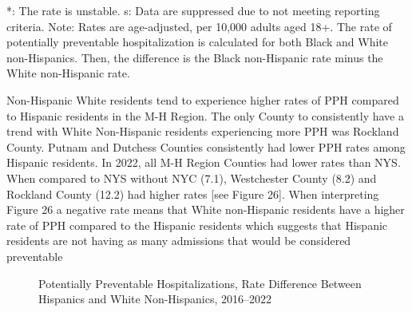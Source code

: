 \documentclass[
  english,
  letterpaper,
]{report}
\begin{document}
\begin{tcolorbox}[enhanced jigsaw, breakable, leftrule=.75mm, title=\textcolor{quarto-callout-note-color}{\faInfo}\hspace{0.5em}{Note}, bottomrule=.15mm, opacityback=0, left=2mm, colback=white, bottomtitle=1mm, coltitle=black, colbacktitle=quarto-callout-note-color!10!white, colframe=quarto-callout-note-color-frame, opacitybacktitle=0.6, toptitle=1mm, titlerule=0mm, arc=.35mm, rightrule=.15mm, toprule=.15mm]

*: The rate is unstable. s: Data are suppressed due to not meeting
reporting criteria. Note: Rates are age-adjusted, per 10,000 adults aged
18+. The rate of potentially preventable hospitalization is calculated
for both Black and White non-Hispanics. Then, the difference is the
Black non-Hispanic rate minus the White non-Hispanic rate.

\end{tcolorbox}

Non-Hispanic White residents tend to experience higher rates of PPH
compared to Hispanic residents in the M-H Region. The only County to
consistently have a trend with White Non-Hispanic residents experiencing
more PPH was Rockland County. Putnam and Dutchess Counties consistently
had lower PPH rates among Hispanic residents. In 2022, all M-H Region
Counties had lower rates than NYS. When compared to NYS without NYC
(7.1), Westchester County (8.2) and Rockland County (12.2) had higher
rates {[}see Figure 26{]}. When interpreting Figure 26 a negative rate
means that White non-Hispanic residents have a higher rate of PPH
compared to the Hispanic residents which suggests that Hispanic
residents are not having as many admissions that would be considered
preventable

\begin{figure}


\caption{\label{fig-pph-white-nh}Potentially Preventable
Hospitalizations, Rate Difference Between Hispanics and White
Non-Hispanics, 2016--2022}

\end{figure}%
\end{document}
